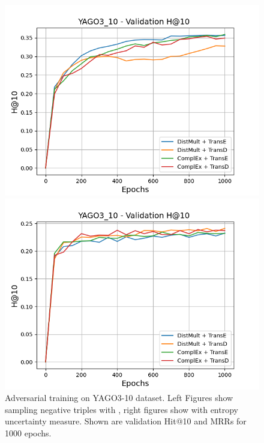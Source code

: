 \begin{figure}[H]
\begin{minipage}{.45\textwidth}
      \includegraphics[width=0.9\linewidth]{figures/results/gan_train/not_pretrained/random/yago3_10/1k_epochs/random_yago3_10_hit10.png}
    \end{minipage}%
    \begin{minipage}{.45\textwidth}
      \centering
      \includegraphics[width=0.9\linewidth]{figures/results/gan_train/not_pretrained/uncertainty/max_distribution/entropy/yago3_10/1k_epochs/uncertainty_yago3_10_hit10.png}
    \end{minipage}%
    \caption{Adversarial training on \textsc{YAGO3-10} dataset. 
    Left Figures show sampling negative triples with \origsampling, right figures show \ussoftmax with entropy uncertainty measure.
    Shown are validation Hit@10 and MRRs for 1000 epochs.}
    \label{fig:advtrain_yago3_10_random_vs_uncertainty}
\end{figure}


